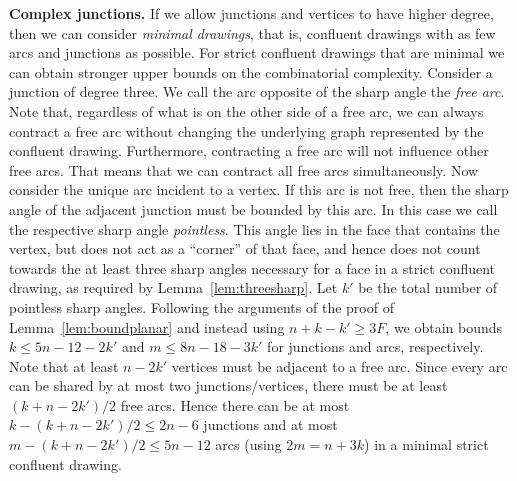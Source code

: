 \documentclass{llncs}
\begin{document}
\smallskip\noindent
{\bf Complex junctions.} If we allow junctions and vertices to have higher degree, then we can consider \emph{minimal drawings}, that is, confluent drawings with as few arcs and junctions as possible. For strict confluent drawings that are minimal we can obtain stronger upper bounds on the combinatorial complexity. Consider a junction of degree three. We call the arc opposite of the sharp angle the \emph{free arc}. Note that, regardless of what is on the other side of a free arc, we can always contract a free arc without changing the underlying graph represented by the confluent drawing. Furthermore, contracting a free arc will not influence other free arcs. That means that we can contract all free arcs simultaneously. Now consider the unique arc incident to a vertex. If this arc is not free, then the sharp angle of the adjacent junction must be bounded by this arc. In this case we call the respective sharp angle \emph{pointless}. This angle lies in the face that contains the vertex, but does not act as a ``corner'' of that face, and hence does not count towards the at least three sharp angles necessary for a face in a strict confluent drawing, as required by Lemma~\ref{lem:threesharp}. Let $k'$ be the total number of pointless sharp angles. Following the arguments of the proof of Lemma~\ref{lem:boundplanar} and instead using $n + k - k' \geq 3F$, we obtain bounds $k \le 5n - 12 - 2k'$ and $m \le 8n - 18 - 3k'$ for junctions and arcs, respectively. Note that at least $n - 2k'$ vertices must be adjacent to a free arc. Since every arc can be shared by at most two junctions/vertices, there must be at least $(k + n - 2k')/2$ free arcs. Hence there can be at most $k - (k + n - 2k')/2 \le 2n - 6$ junctions and at most $m - (k + n - 2k')/2 \le 5n - 12$ arcs (using $2m = n + 3k$) in a minimal strict confluent drawing.
\end{document}
